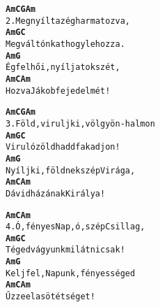 \begin{minipage}{\textwidth}
\kottastart
{}
\kottaend
\begin{minipage}{\textwidth}
\begin{multicols}{2}
\begin{minipage}{\textwidth}
\begin{alltt}
\textbf{    Am             C    G  Am}
2. Megnyílt az ég harmatozva,
\textbf{    Am     G    C}
   Megváltónkat hogy lehozza.
\textbf{   Am                     G}
   Ég felhői, nyíljatok szét,
\textbf{    Am          C      Am}
   Hozva Jákob fejedelmét!
\end{alltt}
\vspace{0.0cm}
\versszakspacing
\end{minipage}
\begin{minipage}{\textwidth}
\begin{alltt}
\textbf{    Am               C       G  Am}
3. Föld, virulj ki, völgyön-halmon
\textbf{    Am     G    C}
   Viruló zöld hadd fakadjon!
\textbf{     Am                        G}
   Nyílj ki, földnek szép Virága,
\textbf{    Am        C        Am}
   Dávid házának Királya!
\end{alltt}
\vspace{0.0cm}
\versszakspacing
\end{minipage}
\begin{minipage}{\textwidth}
\begin{alltt}
\textbf{   Am             C            Am}
4. Ó, fényes Nap, ó, szép Csillag,
\textbf{    Am       G    C}
   Téged vágyunk mi látni csak!
\textbf{    Am                        G}
   Kelj fel, Napunk, fényességed
\textbf{   Am         C      Am}
   Űzze el a sötétséget!
\end{alltt}
\vspace{0.0cm}
\versszakspacing
\end{minipage}
\vspace{0.2cm}
\end{multicols}
\end{minipage}

\end{minipage}
